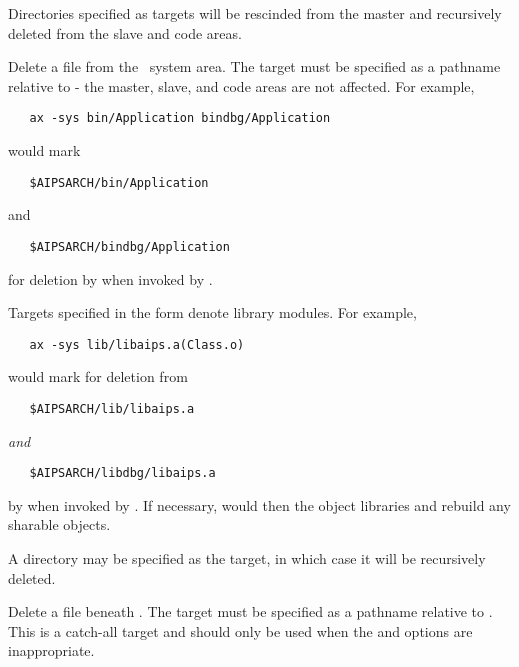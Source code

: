 \begin{description}
   \noindent
   Directories specified as targets will be rescinded from the master and
   recursively deleted from the slave and code areas.

\item[\exe{-sys}]
   Delete a file from the \aipspp\ system area.  The target must be
   specified as a pathname relative to  - the master, slave,
   and code areas are not affected.  For example,

\begin{verbatim}
   ax -sys bin/Application bindbg/Application
\end{verbatim}

   \noindent
   would mark

\begin{verbatim}
   $AIPSARCH/bin/Application
\end{verbatim}

   and

\begin{verbatim}
   $AIPSARCH/bindbg/Application
\end{verbatim}

   \noindent
   for deletion by  when invoked by .

   \noindent
   Targets specified in the form  denote library modules.  For
   example,

\begin{verbatim}
   ax -sys lib/libaips.a(Class.o)
\end{verbatim}

   \noindent
   would mark  for deletion from

\begin{verbatim}
   $AIPSARCH/lib/libaips.a
\end{verbatim}

   {\em and}

\begin{verbatim}
   $AIPSARCH/libdbg/libaips.a
\end{verbatim}

   \noindent
   by  when invoked by .  If necessary,
    would then  the object libraries and
   rebuild any sharable objects.

   \noindent
   A directory may be specified as the target, in which case it will be
   recursively deleted.

\item[\exe{-top}]
   Delete a file beneath .  The target must be specified as a
   pathname relative to .  This is a catch-all target and
   should only be used when the  and  options are
   inappropriate.


\end{description}
